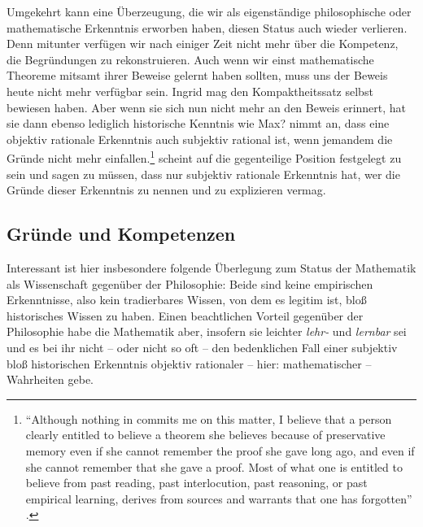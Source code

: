 Umgekehrt kann eine Überzeugung, die wir als eigenständige philosophische oder
mathematische Erkenntnis erworben haben, diesen Status auch wieder verlieren.
Denn mitunter verfügen wir nach einiger Zeit nicht mehr über die Kompetenz, die
Begründungen zu rekonstruieren. Auch wenn wir einst mathematische Theoreme
mitsamt ihrer Beweise gelernt haben sollten, muss uns der Beweis heute nicht
mehr verfügbar sein. Ingrid mag den Kompaktheitssatz selbst bewiesen haben. Aber
wenn sie sich nun nicht mehr an den
Beweis erinnert, hat sie dann ebenso lediglich historische Kenntnis wie Max?
 nimmt an, dass eine objektiv
rationale Erkenntnis auch subjektiv rational ist, wenn jemandem die Gründe
nicht mehr einfallen.\footnote{\enquote{Although nothing in
 commits me on this matter, I believe that a
person clearly  entitled to believe a theorem she believes because
of preservative memory even if she cannot remember the proof she gave long ago,
and even if she cannot remember that she gave a proof. Most of what one is
entitled to believe from past reading, past interlocution, past reasoning, or
past empirical learning, derives from sources and warrants that one has
forgotten} \parencite[][38]{Burge:InterlocutionPerceptionandMemory1997}.}
 scheint auf die gegenteilige Position festgelegt zu sein
und sagen zu müssen, dass nur subjektiv rationale Erkenntnis hat, wer die Gründe
dieser Erkenntnis zu nennen und zu explizieren vermag.

\subsection{Gründe und Kompetenzen}
Interessant ist hier  insbesondere folgende Überlegung zum Status der
Mathematik als Wissenschaft gegenüber der Philosophie: Beide sind keine
empirischen Erkenntnisse, also kein tradierbares Wissen, von dem es legitim ist,
bloß historisches Wissen zu haben. Einen beachtlichen Vorteil gegenüber der
Philosophie habe die Mathematik aber, insofern sie leichter \emph{lehr-} und
\emph{lernbar} sei und es bei ihr nicht -- oder nicht so oft -- den bedenklichen
Fall einer subjektiv bloß historischen Erkenntnis objektiv rationaler -- hier:
mathematischer -- Wahrheiten gebe. 

